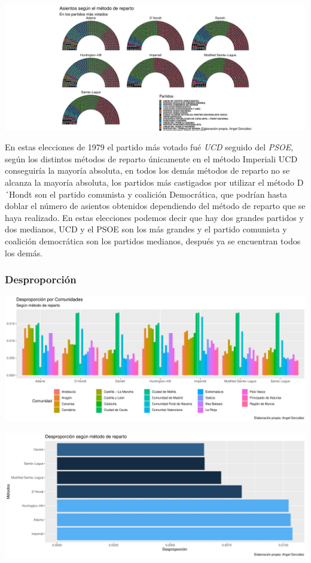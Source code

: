 \documentclass[12pt,a4paper,]{book}
\numberwithin{dummy}{section}
\theoremstyle{ocrenumbox}
\theoremstyle{blacknumex}
\theoremstyle{blacknumbox}
\theoremstyle{ocrenum}
\theoremstyle{ocrenum}
\begin{document}
\begin{center}\includegraphics[width=0.95\linewidth]{figurasR/unnamed-chunk-68-3} \end{center}

En estas elecciones de 1979 el partido más votado fué \emph{UCD} seguido
del \emph{PSOE}, según los distintos métodos de reparto únicamente en el
método Imperiali UCD conseguiría la mayoría absoluta, en todos los demás
métodos de reparto no se alcanza la mayoría absoluta, los partidos más
castigados por utilizar el método D´Hondt son el partido comunista y
coalición Democrática, que podrían hasta doblar el número de asientos
obtenidos dependiendo del método de reparto que se haya realizado. En
estas elecciones podemos decir que hay dos grandes partidos y dos
medianos, UCD y el PSOE son los más grandes y el partido comunista y
coalición democrática son los partidos medianos, después ya se
encuentran todos los demás.

\hypertarget{desproporciuxf3n-1}{%
\subsubsection{Desproporción}\label{desproporciuxf3n-1}}

\begin{center}\includegraphics[width=0.95\linewidth]{figurasR/unnamed-chunk-69-1} \end{center}

\begin{center}\includegraphics[width=0.95\linewidth]{figurasR/unnamed-chunk-69-2} \end{center}
\end{document}

